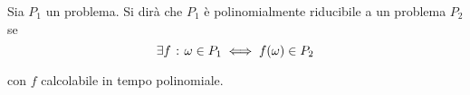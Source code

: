 \documentclass{subfiles}
\begin{document}
\begin{Definition*}
    Sia \(P_{1}\) un problema. Si dirà che \(P_{1}\) è polinomialmente riducibile a un problema \(P_{2}\) se
    \[
        \exists f \operatorname{\: {:} \:} \omega \in P_{1} \iff f(\omega) \in P_{2}
    \]

    \noindent con \(f\) calcolabile in tempo polinomiale.
\end{Definition*}
\end{document}
